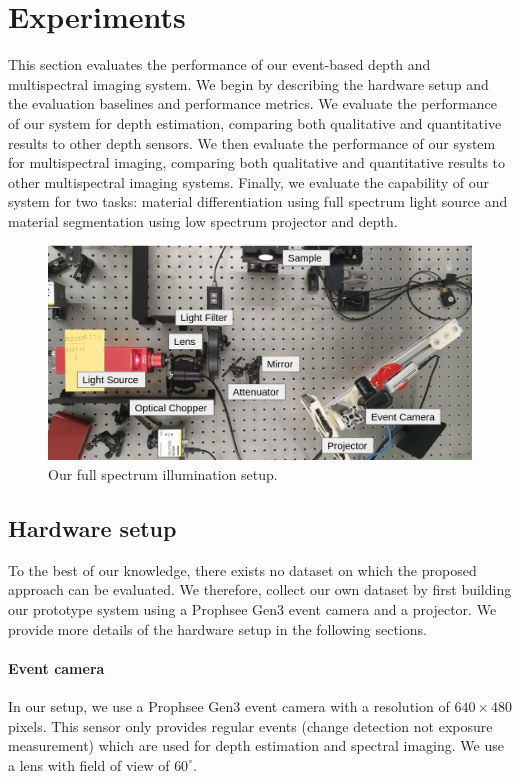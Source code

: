 \section{Experiments}
This section evaluates the performance of our event-based depth and multispectral imaging system.
We begin by describing the hardware setup and the evaluation baselines and performance metrics.
We evaluate the performance of our system for depth estimation, comparing both qualitative and quantitative results to other depth sensors.
We then evaluate the performance of our system for multispectral imaging, comparing both qualitative and quantitative results to other multispectral imaging systems.
Finally, we evaluate the capability of our system for two tasks: material differentiation using full spectrum light source and material segmentation using  low spectrum projector and depth.
% 
\begin{figure}
    \centering
    \includegraphics[width=.5\textwidth]{chapters/papers/ED/resources/images/multi-spectral/experiment_setup.png}
    \caption{Our full spectrum illumination setup.}
    \label{fig:generalSetup}
\end{figure}

\subsection{Hardware setup}
To the best of our knowledge, there exists no dataset on which the proposed approach can be evaluated.
We therefore, collect our own dataset by first building our prototype system using a Prophsee Gen3 event camera \cite{} and a projector.
We provide more details of the hardware setup in the following sections.

\paragraph{Event camera}
In our setup, we use a Prophsee Gen3 event camera \cite{Posch11ssc} with a resolution of $640\times480$ pixels.
This sensor only provides regular events (change detection not exposure measurement) which are used for depth estimation and spectral imaging.
We use a lens with field of view of $60^\circ$.

